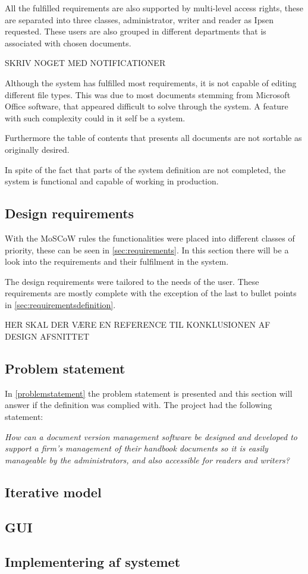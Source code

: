 All the fulfilled requirements are also supported by multi-level access rights, these are separated into three classes, administrator, writer and reader as Ipsen requested. These users are also grouped in different departments that is associated with chosen documents. 

SKRIV NOGET MED NOTIFICATIONER

Although the system has fulfilled most requirements, it is not capable of editing different file types. This was due to most documents stemming from Microsoft Office software, that appeared difficult to solve through the system. A feature with such complexity could in it self be a system.

Furthermore the table of contents that presents all documents are not sortable as originally desired.

In spite of the fact that parts of the system definition are not completed, the system is functional and capable of working in production. 

\subsection{Design requirements}
With the MoSCoW rules the functionalities were placed into different classes of priority, these can be seen in \cref{sec:requirements}. In this section there will be a look into the requirements and their fulfilment in the system.

The design requirements were tailored to the needs of the user. These requirements are mostly complete with the exception of the last to bullet points in \cref{sec:requirementsdefinition}. 

HER SKAL DER VÆRE EN REFERENCE TIL KONKLUSIONEN AF DESIGN AFSNITTET

\subsection{Problem statement}
In \cref{problemstatement} the problem statement is presented and this section will answer if the definition was complied with. The project had the following statement:

\begin{center}
\textit{How can a document version management software be designed and developed to support a firm's management of their handbook documents so it is easily manageable by the administrators, and also accessible for readers and writers?}
\end{center}



\subsection{Iterative model}

\subsection{GUI}



\subsection{Implementering af systemet}